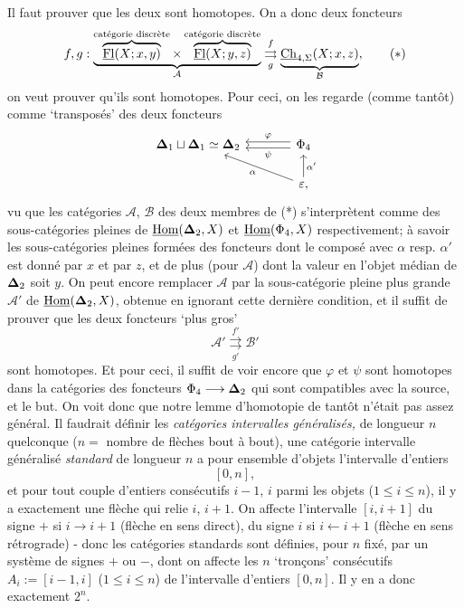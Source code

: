 Il faut prouver que les deux sont homotopes. On a donc deux foncteurs
\[
f,g : \underbrace{\overbrace{\uFl(X;x,y)}^{\text{catégorie discrète}} \times \overbrace{\uFl(X;y,z)}^{\text{catégorie discrète}}}_{\mathcal{A}} \underset{g}{\overset{f}{\rightrightarrows}} \underbrace{\uCh_{4,\Sigma}(X;x,z)}_{\mathcal{B}}, \tag*{$(\ast)$}
\]
on veut prouver qu'ils sont homotopes. Pour ceci, on les regarde (comme tantôt) comme `transposés' des deux foncteurs
\[
\begin{tikzcd}[column sep=large]
\bDelta_1 \sqcup \bDelta_1 \simeq \bDelta_2 & \Phi_4 \arrow[l, shift right, "\varphi"'] \arrow[l, shift left, "\psi"] \\
& \varepsilon, \arrow[ul, "\alpha"] \arrow[u, "\alpha'"']
\end{tikzcd}
\]
vu que les catégories $\mathcal{A}$, $\mathcal{B}$ des deux membres de (*) s'interprètent comme des sous-catégories pleines de $\underline{\mathrm{Hom}}(\boldsymbol{\Delta}_2, X)$ et $\underline{\mathrm{Hom}}(\Phi_4, X)$ respectivement; à savoir les sous-catégories pleines formées des foncteurs dont le composé avec $\alpha$ resp. $\alpha'$ est donné par $x$ et par $z$, et de plus (pour $\mathcal{A}$) dont la valeur en l'objet médian de $\boldsymbol{\Delta}_2$ soit $y$. On peut encore remplacer $\mathcal{A}$ par la sous-catégorie pleine plus grande $\mathcal{A}'$ de $\underline{\mathrm{Hom}}(\boldsymbol{\Delta}_2, X)$, obtenue en ignorant cette dernière condition, et il suffit de prouver que les deux foncteurs `plus gros'
\[
\mathcal{A}' \underset{g'}{\overset{f'}{\rightrightarrows}} \mathcal{B}'
\]
sont homotopes. Et pour ceci, il suffit de
voir encore que $\varphi$ et $\psi$ sont homotopes dans la catégories des foncteurs $\Phi_4 \longrightarrow \boldsymbol{\Delta}_2$ qui sont compatibles avec la source, et le but. On voit donc que notre lemme d'homotopie de tantôt n'était pas assez général. Il faudrait définir les \textit{catégories intervalles généralisés,} de longueur $n$ quelconque ($n =$ nombre de flèches bout à bout), une catégorie intervalle généralisé \textit{standard} de longueur $n$ a pour ensemble d'objets l'intervalle d'entiers %
\[
[0,n],
\]
et pour tout couple d'entiers consécutifs $i-1$, $i$ parmi les objets ($1 \leq i \leq n$), il y a exactement une flèche qui relie $i$, $i+1$. On affecte l'intervalle $[i,i+1]$ du signe $+$ si $i \longrightarrow i+1$ (flèche en sens direct), du signe $i$ si $i \longleftarrow i+1$ (flèche en sens rétrograde) - donc les catégories standards sont définies, pour $n$ fixé, par un système de signes $+$ ou $-$, dont on affecte les $n$ `tronçons' consécutifs $A_i := [i-1,i]$ ($1 \leq i \leq n$) de l'intervalle d'entiers $[0,n]$. Il y en a donc exactement $2^n$.


